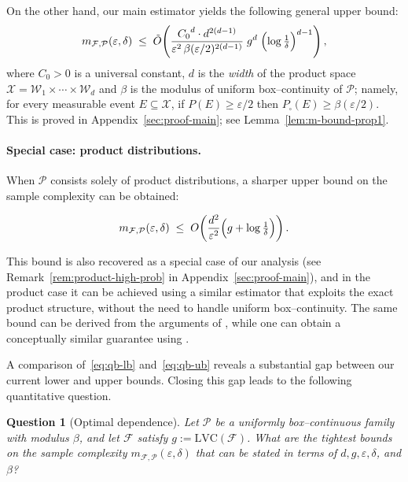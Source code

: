 \documentclass[arxiv]{colt2026}
\newtheorem{question}[theorem]{Question}
\newcommand{\X}{\mathcal{X}}
\newcommand{\F}{\mathcal{F}}
\newcommand{\W}{\mathcal{W}}
\newcommand{\Pc}{\mathcal{P}}
\newcommand{\eps}{\varepsilon}
\newcommand{\LVC}{\mathrm{LVC}}
\begin{document}
On the other hand, our main estimator yields the following general upper bound:
\begin{equation}\label{eq:qb-ub}
m_{\F,\Pc}(\eps,\delta)
\;\le\;
 \tilde{O}\!\left(
\frac{{{C_0}^d} \cdot d^{2(d-1)}}{\eps^2\,\beta(\eps/2)^{2(d-1)}}
\; g^{d}\;
\Bigl(\log\tfrac{1}{\delta}\Bigr)^{d-1}
\right),
\end{equation}
where {${C_0} > 0$ is a universal constant},  $d$ is the \emph{width} of the product space $\X=\W_1\times\cdots\times\W_d$ and $\beta$ is the modulus of uniform box--continuity of $\Pc$; namely, for every measurable event $E\subseteq\X$, if $P(E)\ge \eps/2$ then $P_{\square}(E)\ge \beta(\eps/2)$. This is proved in Appendix~\ref{sec:proof-main}; see Lemma~\ref{lem:m-bound-prop1}.

\vspace{-0.3em}
\paragraph{Special case: product distributions.}
When $\Pc$ consists solely of product distributions, a sharper upper bound on the
sample complexity can be obtained:

\vspace{-0.5em}
\[
m_{\F,\Pc}(\varepsilon,\delta)
\;\le\;
O\!\left(\frac{d^2}{\varepsilon^2}\Bigl(g+\log\tfrac{1}{\delta}\Bigr)\right).
\]

\vspace{-0.1em}
This bound is also recovered as a special case of our analysis
(see Remark~\ref{rem:product-high-prob} in Appendix~\ref{sec:proof-main}),
and in the product case it can be achieved using a similar estimator that exploits the exact
product structure, without the need to handle uniform box--continuity.
The same bound can be derived from the arguments of
\citet{cai2017,livni2019}, while one can obtain a conceptually similar guarantee using
\citet{coregliano2024}.

\smallskip
A comparison of~\eqref{eq:qb-lb} and~\eqref{eq:qb-ub} reveals a substantial gap
between our current lower and upper bounds.
Closing this gap leads to the following quantitative question.

\vspace{-0.5em}
\begin{question}[Optimal dependence]
\label{oq:tightness-d}
Let $\Pc$ be a uniformly box--continuous family with modulus $\beta$, and let
$\F$ satisfy $g:=\LVC(\F)$.
What are the tightest bounds on the sample
complexity $m_{\F,\Pc}(\eps,\delta)$ that can be stated in terms of
$d,g,\eps,\delta$, and $\beta$?
\end{question}
\end{document}
